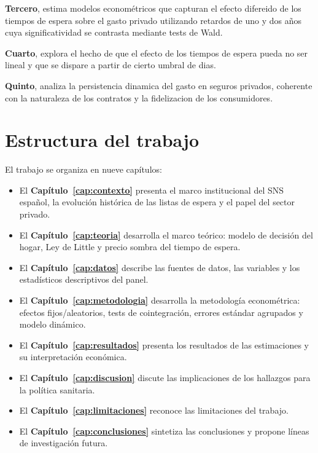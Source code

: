 \textbf{Tercero}, estima modelos econométricos que capturan el efecto difereido
 de los tiempos de espera sobre el gasto privado utilizando retardos de uno y dos años
 cuya significatividad se contrasta mediante tests de Wald.

\textbf{Cuarto}, explora el hecho de que el efecto de los tiempos de espera pueda no ser
lineal y que se dispare a partir de cierto umbral de dias.

\textbf{Quinto}, analiza la persistencia dinamica del gasto en seguros privados, coherente con la 
naturaleza de los contratos y la fidelizacion de los consumidores.

\section{Estructura del trabajo}

El trabajo se organiza en nueve capítulos:

\begin{itemize}
  \item El \textbf{Capítulo~\ref{cap:contexto}} presenta el marco institucional del
    SNS español, la evolución histórica de las listas de espera y el papel del
    sector privado.
  \item El \textbf{Capítulo~\ref{cap:teoria}} desarrolla el marco teórico: modelo
    de decisión del hogar, Ley de Little y precio sombra del tiempo de espera.
  \item El \textbf{Capítulo~\ref{cap:datos}} describe las fuentes de datos, las
    variables y los estadísticos descriptivos del panel.
  \item El \textbf{Capítulo~\ref{cap:metodologia}} desarrolla la metodología
    econométrica: efectos fijos/aleatorios, tests de cointegración, errores
    estándar agrupados y modelo dinámico.
  \item El \textbf{Capítulo~\ref{cap:resultados}} presenta los resultados de las
    estimaciones y su interpretación económica.
  \item El \textbf{Capítulo~\ref{cap:discusion}} discute las implicaciones de los
    hallazgos para la política sanitaria.
  \item El \textbf{Capítulo~\ref{cap:limitaciones}} reconoce las limitaciones del
    trabajo.
  \item El \textbf{Capítulo~\ref{cap:conclusiones}} sintetiza las conclusiones y
    propone líneas de investigación futura.
\end{itemize}
